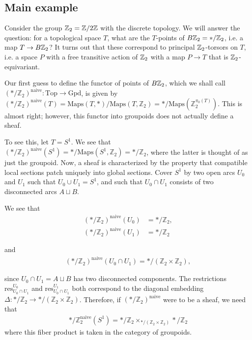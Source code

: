 \documentclass[12pt]{article}
\begin{document}
\subsection{Main example}
Consider the group $\mathbb{Z}_2 = \mathbb{Z}/2\mathbb{Z}$ with the discrete topology. We will answer the question: for a topological space $T$, what are the $T$-points of $B\mathbb{Z}_2 = */\mathbb{Z}_2$, i.e. a map $T \to B\mathbb{Z}_2$? It turns out that these correspond to principal $\mathbb{Z}_2$-torsors on $T$, i.e. a space $P$ with a free transitive action of $\mathbb{Z}_2$ with a map $P \to T$ that is $\mathbb{Z}_2$-equivariant.

Our first guess to define the functor of points of $B\mathbb{Z}_2$, which we shall call $(*/\mathbb{Z}_2)^{\text{naive}} : \text{Top} \to \text{Gpd}$, is given by
$(*/\mathbb{Z}_2)^{\text{naive}}(T) = \text{Maps}(T, *)/\text{Maps}(T, \mathbb{Z}_2) = */\text{Maps}(\mathbb{Z}_2^{\pi_0(T)})$. This is almost right; however, this functor into groupoids does not actually define a sheaf.

To see this, let $T = S^1$. We see that $(*/\mathbb{Z}_2)^{\text{naive}}(S^1) = */\text{Maps}(S^1, \mathbb{Z}_2) = */\mathbb{Z}_2$, where the latter is thought of as just the groupoid. Now, a sheaf is characterized by the property that compatible local sections patch uniquely into global sections. Cover $S^1$ by two open arcs $U_0$ and $U_1$
such that $U_0 \cup U_1 = S^1$, and such that $U_0 \cap U_1$ consists of two disconnected arcs $A \sqcup B$.

We see that
\begin{align}
    (*/\mathbb{Z}_2)^{\text{naive}}(U_0) & = */\mathbb{Z}_2, \\
    (*/\mathbb{Z}_2)^{\text{naive}}(U_1) & = */\mathbb{Z}_2
\end{align}

and
\begin{align}
    (*/\mathbb{Z}_2)^{\text{naive}}(U_0 \cap U_1) = */(\mathbb{Z}_2 \times \mathbb{Z}_2),
\end{align}

since $U_0 \cap U_1 = A \sqcup B$ has two disconnected components. The restrictions $\text{res}_{U_0 \cap U_1}^{U_0}$ and
$\text{res}_{U_0 \cap U_1}^{U_1}$ both correspond to the diagonal embedding $\Delta : */\mathbb{Z}_2 \to */(\mathbb{Z}_2 \times \mathbb{Z}_2)$. Therefore, if $(*/\mathbb{Z}_2)^{\text{naive}}$ were to be a sheaf, we need that \begin{align*}
    */\mathbb{Z}_2^{\text{naive}}(S^1) = */\mathbb{Z}_2 \times_{*/(\mathbb{Z}_2 \times \mathbb{Z}_2)} */\mathbb{Z}_2
\end{align*} where this fiber product is taken in the category of groupoids.
\end{document}
